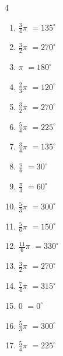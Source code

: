 \begin{multicols}{4}
\begin{enumerate}
  \item $\displaystyle \frac{3}{4}\pi$
        $\displaystyle =135^{\circ}$

  \item $\displaystyle \frac{3}{2}\pi$
        $\displaystyle =270^{\circ}$

  \item $\displaystyle \pi$
        $\displaystyle =180^{\circ}$

\columnbreak %

  \item $\displaystyle \frac{2}{3}\pi$
        $\displaystyle =120^{\circ}$

  \item $\displaystyle \frac{3}{2}\pi$
        $\displaystyle =270^{\circ}$

  \item $\displaystyle \frac{5}{4}\pi$
        $\displaystyle =225^{\circ}$

  \item $\displaystyle \frac{3}{4}\pi$
        $\displaystyle =135^{\circ}$

  \item $\displaystyle \frac{\pi}{6}$
        $\displaystyle =30^{\circ}$

  \item $\displaystyle \frac{\pi}{3}$
        $\displaystyle =60^{\circ}$

  \item $\displaystyle \frac{5}{3}\pi$
        $\displaystyle =300^{\circ}$

  \item $\displaystyle \frac{5}{6}\pi$
        $\displaystyle =150^{\circ}$

  \item $\displaystyle \frac{11}{6}\pi$
        $\displaystyle =330^{\circ}$

  \item $\displaystyle \frac{3}{2}\pi$
        $\displaystyle =270^{\circ}$

  \item $\displaystyle \frac{7}{4}\pi$
        $\displaystyle =315^{\circ}$

  \item $\displaystyle 0$
        $\displaystyle =0^{\circ}$

  \item $\displaystyle \frac{5}{3}\pi$
        $\displaystyle =300^{\circ}$

  \item $\displaystyle \frac{5}{4}\pi$
        $\displaystyle =225^{\circ}$


\end{enumerate}
\end{multicols}
